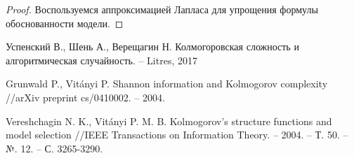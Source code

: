 \documentclass[../main.tex]{subfiles}
\begin{document}
\begin{proof}
Воспользуемся аппроксимацией Лапласа для упрощения формулы обоснованности модели.

\end{proof}
\begin{thebibliography}{99}
	Успенский В., Шень А., Верещагин Н. Колмогоровская сложность и алгоритмическая случайность. – Litres, 2017

Grunwald P., Vitányi P. Shannon information and Kolmogorov complexity //arXiv preprint cs/0410002. – 2004.

Vereshchagin N. K., Vitányi P. M. B. Kolmogorov's structure functions and model selection //IEEE Transactions on Information Theory. – 2004. – Т. 50. – №. 12. – С. 3265-3290.
\end{thebibliography}
\end{document}
